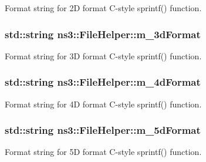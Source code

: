 Format string for 2D format C-\/style sprintf() function. 

\subsubsection[{\texorpdfstring{m\+\_\+3d\+Format}{m_3dFormat}}]{\setlength{\rightskip}{0pt plus 5cm}std\+::string ns3\+::\+File\+Helper\+::m\+\_\+3d\+Format\hspace{0.3cm}{\ttfamily [private]}}\hypertarget{classns3_1_1FileHelper_ad1fde05299cc3d892f38844e38cd902f}{}\label{classns3_1_1FileHelper_ad1fde05299cc3d892f38844e38cd902f}


Format string for 3D format C-\/style sprintf() function. 

\subsubsection[{\texorpdfstring{m\+\_\+4d\+Format}{m_4dFormat}}]{\setlength{\rightskip}{0pt plus 5cm}std\+::string ns3\+::\+File\+Helper\+::m\+\_\+4d\+Format\hspace{0.3cm}{\ttfamily [private]}}\hypertarget{classns3_1_1FileHelper_aaec049f83d5aeac80beb62b6e3b2816d}{}\label{classns3_1_1FileHelper_aaec049f83d5aeac80beb62b6e3b2816d}


Format string for 4D format C-\/style sprintf() function. 

\subsubsection[{\texorpdfstring{m\+\_\+5d\+Format}{m_5dFormat}}]{\setlength{\rightskip}{0pt plus 5cm}std\+::string ns3\+::\+File\+Helper\+::m\+\_\+5d\+Format\hspace{0.3cm}{\ttfamily [private]}}\hypertarget{classns3_1_1FileHelper_ace51d3b3bb8e63f4f3c24f6571fb6d48}{}\label{classns3_1_1FileHelper_ace51d3b3bb8e63f4f3c24f6571fb6d48}


Format string for 5D format C-\/style sprintf() function. 


